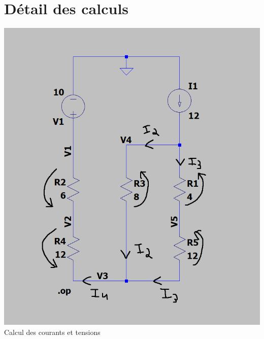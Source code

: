 \documentclass{homeworg}
\begin{document}
\section{Détail des calculs}
    \begin{center}
        \includegraphics[scale=0.5]{Calculs.png}\\
        \large
        Calcul des courants et tensions
    \end{center}
    \normalsize
\end{document}
